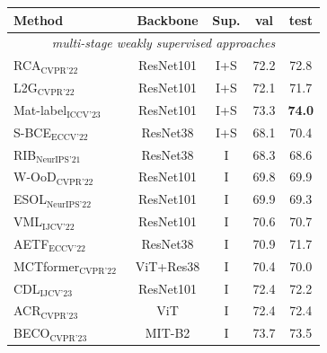 \begin{table}[!t]
    \centering
    \renewcommand{\arraystretch}{1.2}
    \setlength{\tabcolsep}{6pt}
    \begin{tabular}{l c c c c}
        \hline
        \textbf{Method}                                                               & \textbf{Backbone}   & \textbf{Sup.} & \textbf{val}           & \textbf{test}          \\
        \hline
        \multicolumn{5}{c}{\textit{multi-stage weakly supervised approaches}}                                                    \\
        RCA$_{\text{CVPR'22}}$~\cite{wsss_RCA}             & ResNet101  & I+S  & 72.2          & 72.8          \\
        L2G$_{\text{CVPR'22}}$~\cite{wsss_L2G}             & ResNet101  & I+S  & 72.1          & 71.7          \\
        Mat-label$_{\text{ICCV'23}}$~\cite{wsss_MatLabel}  & ResNet101  & I+S  & 73.3          & \textbf{74.0} \\
        S-BCE$_{\text{ECCV'22}}$~\cite{wsss_s_bce}         & ResNet38   & I+S  & 68.1          & 70.4          \\
        RIB$_{\text{NeurIPS'21}}$~\cite{wsss_rib}          & ResNet38   & I    & 68.3          & 68.6          \\
        W-OoD$_{\text{CVPR'22}}$~\cite{wsss_ood}      & ResNet101  & I    & 69.8          & 69.9          \\
        ESOL$_{\text{NeurIPS'22}}$~\cite{wsss_esol}   & ResNet101  & I    & 69.9          & 69.3          \\
        VML$_{\text{IJCV'22}}$~\cite{wsss_vml}        & ResNet101  & I    & 70.6          & 70.7          \\
        AETF$_{\text{ECCV'22}}$~\cite{wsss_aetf}      & ResNet38   & I    & 70.9          & 71.7          \\
        MCTformer$_{\text{CVPR'22}}$~\cite{wsss_MCTformer} & ViT+Res38  & I    & 70.4          & 70.0          \\
        CDL$_{\text{IJCV'23}}$~\cite{wsss_cdl}        & ResNet101  & I    & 72.4          & 72.2          \\
        ACR$_{\text{CVPR'23}}$~\cite{wsss_acr}        & ViT        & I    & 72.4          & 72.4          \\
        BECO$_{\text{CVPR'23}}$~\cite{wsss_beco}      & MIT-B2     & I    & 73.7          & 73.5          \\

\end{tabular}
\end{table}

